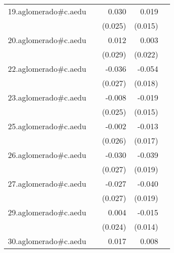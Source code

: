 {\begin{longtable}{l*{4}{D{.}{.}{-1}}}
\addlinespace
19.aglomerado#c.aedu&                     &       0.030         &       0.019         &                     \\
            &                     &     (0.025)         &     (0.015)         &                     \\
\addlinespace
20.aglomerado#c.aedu&                     &       0.012         &       0.003         &                     \\
            &                     &     (0.029)         &     (0.022)         &                     \\
\addlinespace
22.aglomerado#c.aedu&                     &      -0.036         &      -0.054\sym{**} &                     \\
            &                     &     (0.027)         &     (0.018)         &                     \\
\addlinespace
23.aglomerado#c.aedu&                     &      -0.008         &      -0.019         &                     \\
            &                     &     (0.025)         &     (0.015)         &                     \\
\addlinespace
25.aglomerado#c.aedu&                     &      -0.002         &      -0.013         &                     \\
            &                     &     (0.026)         &     (0.017)         &                     \\
\addlinespace
26.aglomerado#c.aedu&                     &      -0.030         &      -0.039\sym{*}  &                     \\
            &                     &     (0.027)         &     (0.019)         &                     \\
\addlinespace
27.aglomerado#c.aedu&                     &      -0.027         &      -0.040\sym{*}  &                     \\
            &                     &     (0.027)         &     (0.019)         &                     \\
\addlinespace
29.aglomerado#c.aedu&                     &       0.004         &      -0.015         &                     \\
            &                     &     (0.024)         &     (0.014)         &                     \\
\addlinespace
30.aglomerado#c.aedu&                     &       0.017         &       0.008         &                     \\

\end{longtable}}
